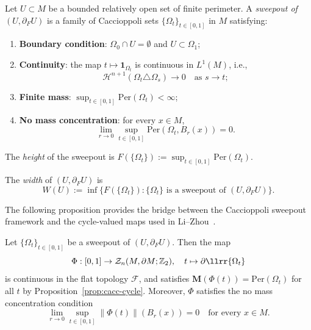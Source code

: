\begin{definition}\label{def:sweepout}
Let $U \subset M$ be a bounded relatively open set of finite perimeter. A \emph{sweepout of $(U, \partial_F U)$} is a family of Caccioppoli sets $\{\Omega_t\}_{t \in [0,1]}$ in $M$ satisfying:
\begin{enumerate}[label=\textup{(sw\arabic*)}]
    \item\label{sw:boundary} \textbf{Boundary condition}: $\Omega_0 \cap U = \emptyset$ and $U \subset \Omega_1$;
    \item\label{sw:continuity} \textbf{Continuity}: the map $t \mapsto \mathbf{1}_{\Omega_t}$ is continuous in $L^1(M)$, i.e.,
    \[
    \mathcal{H}^{n+1}(\Omega_t \triangle \Omega_s) \to 0 \quad \text{as } s \to t;
    \]
    \item\label{sw:finite-mass} \textbf{Finite mass}: $\sup_{t \in [0,1]} \mathrm{Per}(\Omega_t) < \infty$;
    \item\label{sw:no-concentration} \textbf{No mass concentration}: for every $x \in M$,
    \[
    \lim_{r \to 0} \sup_{t \in [0,1]} \mathrm{Per}(\Omega_t, B_r(x)) = 0.
    \]
\end{enumerate}
The \emph{height} of the sweepout is $F(\{\Omega_t\}) := \sup_{t \in [0,1]} \mathrm{Per}(\Omega_t)$.
\end{definition}

\begin{definition}[Width]\label{def:width}
The \emph{width} of $(U, \partial_F U)$ is
\[
W(U) := \inf\bigl\{ F(\{\Omega_t\}) : \{\Omega_t\} \text{ is a sweepout of } (U, \partial_F U) \bigr\}.
\]
\end{definition}

The following proposition provides the bridge between the Caccioppoli sweepout framework and the cycle-valued maps used in Li--Zhou~\cite{LZ17}.

\begin{proposition}\label{prop:sweepout-cycle}
Let $\{\Omega_t\}_{t \in [0,1]}$ be a sweepout of $(U, \partial_F U)$. Then the map
\[
\Phi: [0,1] \to \mathcal{Z}_n(M, \partial M;\mathbb{Z}_2), \quad t \mapsto \partial\llrr{\Omega_t}
\]
is continuous in the flat topology $\mathcal{F}$, and satisfies $\mathbf{M}(\Phi(t)) = \mathrm{Per}(\Omega_t)$ for all $t$ by Proposition~\ref{prop:cacc-cycle}. Moreover, $\Phi$ satisfies the no mass concentration condition
\[
\lim_{r \to 0} \sup_{t \in [0,1]} \|\Phi(t)\|(B_r(x)) = 0 \quad \text{for every } x \in M.
\]
\end{proposition}

